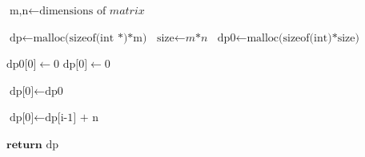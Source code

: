 \begin{algorithm}
	\caption{Parallel Matrix initialisation}\label{alg:parnewmatrix}
	\begin{algorithmic}[3]
		\State $\text{m,n} \gets \text{dimensions of }\textit{matrix}$

		\State $\text{dp} \gets \text{malloc(sizeof(int *)*m)}$
		\State $\text{size} \gets \textit{m*n}$
		\State $\text{dp0} \gets \text{malloc(sizeof(int)*size)}$
		
			\State $\text{dp0[0]} \gets 0$
		\EndFor
			\State $\text{dp[0]} \gets 0$
		\EndFor
		
		\State $\text{dp[0]} \gets \text{dp0}$
		
		\State $\text{dp[0]} \gets \text{dp[i-1] + n}$
		\EndFor
		
		\State $\textbf{return } \text{dp}$
		\EndProcedure
	\end{algorithmic}
\end{algorithm}
